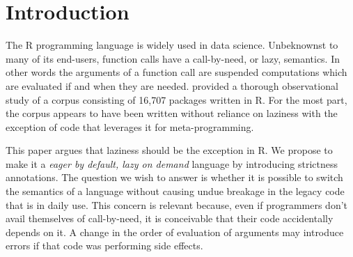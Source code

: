 \documentclass[review,nonacm,screen,acmsmall,anonymous=true]{acmart}
\begin{document}


\maketitle
\section{Introduction}

The R programming language is widely used in data science. Unbeknownst to many
of its end-users, function calls have a call-by-need, or lazy, semantics. In
other words the arguments of a function call are suspended computations which
are evaluated if and when they are needed. \citet{oopsla19b} provided a thorough
observational study of a corpus consisting of 16,707 packages written in R. For
the most part, the corpus appears to have been written without reliance on
laziness with the exception of code that leverages it for meta-programming.

This paper argues that laziness should be the exception in R. We propose to make
it a \emph{eager by default, lazy on demand} language by introducing strictness
annotations. The question we wish to answer is whether it is possible to switch
the semantics of a language without causing undue breakage in the legacy code
that is in daily use. This concern is relevant because, even if programmers
don't avail themselves of call-by-need, it is conceivable that their code
accidentally depends on it. A change in the order of evaluation of arguments may
introduce errors if that code was performing side effects.
\end{document}
